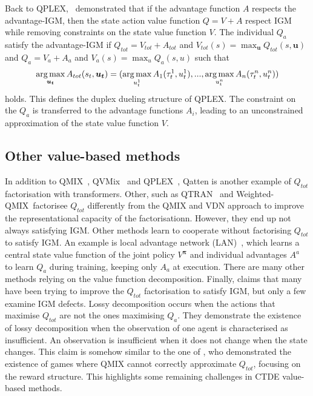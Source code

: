 Back to QPLEX,~\citet{wang2021qplex} demonstrated that if the advantage function $A$ respects the advantage-IGM, then the state action value function $Q = V + A$ respect IGM while removing constraints on the state value function $V$.
The individual $Q_a$ satisfy the advantage-IGM if $Q_{tot}=V_{tot}+A_{tot}$ and $V_{tot}(s)=\max_{\mathbf{u}} Q_{tot}(s, \mathbf{u})$ and $Q_a=V_a+A_a$ and $V_a(s)=\max_{u} Q_a(s, u)$ such that 
\begin{equation}
    \argmax_{\mathbf{u_t}} A_{tot}(s_t, \mathbf{u_t}) =(\argmax_{u_t^{1}} A_{1}(\tau_t^{1}, u_t^{1}),...,\argmax_{u_t^{n}} A_{n}(\tau_t^{n}, u_t^{n}))    
\label{eq:ch3_adv_igm}
\end{equation}
holds.
This defines the duplex dueling structure of QPLEX.
The constraint on the $Q_a$ is transferred to the advantage functions $A_i$, leading to an unconstrained approximation of the state value function $V$.

\subsection{Other value-based methods}
In addition to QMIX~\citep{Rashid2018}, QVMix~\citep{leroy2020qvmix} and QPLEX~\citep{wang2021qplex}, Qatten \citep{yang2020qatten} is another example of $Q_{tot}$ factorisation with transformers.
Other, such as QTRAN~\citep{Son2019QTRAN:Learning} and Weighted-QMIX~\citep{rashid2020weighted}factorisee $Q_{tot}$ differently from the QMIX and VDN approach to improve the representational capacity of the factorisationn.
However, they end up not always satisfying IGM.
Other methods learn to cooperate without factorising $Q_{tot}$ to satisfy IGM.
An example is local advantage network (LAN)~\citep{avalos2023local}, which learns a central state value function of the joint policy $V^{\mathbf{\pi}}$ and individual advantages $A^a$ to learn $Q_a$ during training, keeping only $A_a$ at execution.
There are many other methods relying on the value function decomposition.
Finally, \cite{hong_rethinkigm} claims that many have been trying to improve the $Q_{tot}$ factorisation to satisfy IGM, but only a few examine IGM defects.
Lossy decomposition occurs when the actions that maximise $Q_{tot}$ are not the ones maximising $Q_a$.
They demonstrate the existence of lossy decomposition when the observation of one agent is characterised as insufficient.
An observation is insufficient when it does not change when the state changes. 
This claim is somehow similar to the one of \cite{Mahajan2019MAVEN:Exploration}, who demonstrated the existence of games where QMIX cannot correctly approximate  $Q_{tot}$, focusing on the reward structure.
This highlights some remaining challenges in CTDE value-based methods.

